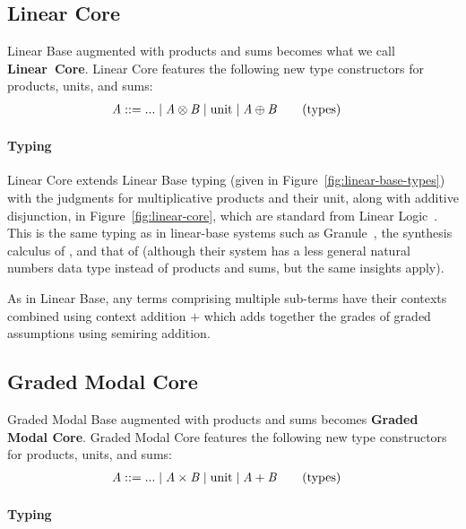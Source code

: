 \subsection{Linear Core}
\label{sec:linear-core}

Linear Base augmented with products and sums becomes what we call \textbf{Linear~Core}.
Linear Core features the following new type constructors for products,
units, and sums:
%
\begin{align*}
  \mathit{A} & ::= ... \mid  \mathit{A}  \otimes  \mathit{B}  \mid  \mathrm{unit}  \mid  \mathit{A}  \oplus  \mathit{B} 
  \tag{types}
\end{align*}

\paragraph{Typing} Linear Core extends Linear Base typing (given in Figure~\ref{fig:linear-base-types})
with the judgments for multiplicative products and their unit, along with additive disjunction, in Figure~\ref{fig:linear-core}, which
are standard from Linear Logic~\cite{girard1987linear}. This is the same typing as in linear-base systems such as Granule~\cite{DBLP:journals/pacmpl/OrchardLE19,DBLP:journals/corr/abs-2112-14966}, the synthesis calculus of \citet{hughes2021linear}, and that of \citet{brunel2014core} (although
their system has a less general natural numbers data type instead of products and sums, but the same insights apply).

As in Linear Base, any terms comprising multiple sub-terms have their contexts
combined using context addition $+$ which adds together the grades of
graded assumptions using semiring addition.



\subsection{Graded Modal Core}
\label{sec:graded-core}

Graded Modal Base augmented with products and sums becomes \textbf{Graded Modal Core}.
Graded Modal Core features the following new type constructors for products, units, and sums:
%
\begin{align*}
  \mathit{A} & ::= ... \mid  \mathit{A}  \times  \mathit{B}  \mid  \mathrm{unit}  \mid  \mathit{A}  +  \mathit{B} 
  \tag{types}
\end{align*}

\paragraph{Typing}

